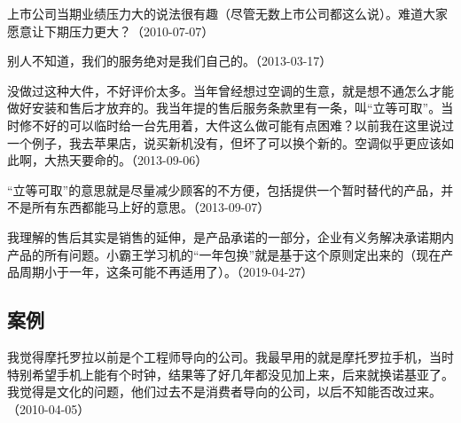 上市公司当期业绩压力大的说法很有趣（尽管无数上市公司都这么说）。难道大家愿意让下期压力更大？（2010-07-07）


别人不知道，我们的服务绝对是我们自己的。（2013-03-17）


没做过这种大件，不好评价太多。当年曾经想过空调的生意，就是想不通怎么才能做好安装和售后才放弃的。我当年提的售后服务条款里有一条，叫“立等可取”。当时修不好的可以临时给一台先用着，大件这么做可能有点困难？以前我在这里说过一个例子，我去苹果店，说买新机没有，但坏了可以换个新的。空调似乎更应该如此啊，大热天要命的。（2013-09-06）


“立等可取”的意思就是尽量减少顾客的不方便，包括提供一个暂时替代的产品，并不是所有东西都能马上好的意思。（2013-09-07）


我理解的售后其实是销售的延伸，是产品承诺的一部分，企业有义务解决承诺期内产品的所有问题。小霸王学习机的“一年包换”就是基于这个原则定出来的（现在产品周期小于一年，这条可能不再适用了）。（2019-04-27）

\subsection{案例}


我觉得摩托罗拉以前是个工程师导向的公司。我最早用的就是摩托罗拉手机，当时特别希望手机上能有个时钟，结果等了好几年都没见加上来，后来就换诺基亚了。我觉得是文化的问题，他们过去不是消费者导向的公司，以后不知能否改过来。（2010-04-05）



